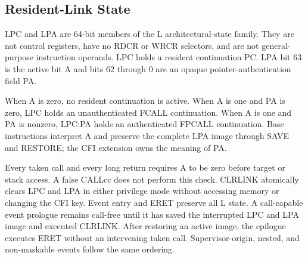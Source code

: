 \subsection{Resident-Link State}\label{section:resident-link-state}
LPC and LPA are 64-bit members of the L architectural-state family. They are not control registers, have no RDCR or WRCR selectors, and are not general-purpose instruction operands. LPC holds a resident continuation PC. LPA bit 63 is the active bit A and bits 62 through 0 are an opaque pointer-authentication field PA.

When A is zero, no resident continuation is active. When A is one and PA is zero, LPC holds an unauthenticated FCALL continuation. When A is one and PA is nonzero, LPC:PA holds an authenticated FPCALL continuation. Base instructions interpret A and preserve the complete LPA image through SAVE and RESTORE; the CFI extension owns the meaning of PA.

Every taken call and every long return requires A to be zero before target or stack access. A false CALLcc does not perform this check. CLRLINK atomically clears LPC and LPA in either privilege mode without accessing memory or changing the CFI key. Event entry and ERET preserve all L state. A call-capable event prologue remains call-free until it has saved the interrupted LPC and LPA image and executed CLRLINK. After restoring an active image, the epilogue executes ERET without an intervening taken call. Supervisor-origin, nested, and non-maskable events follow the same ordering.
